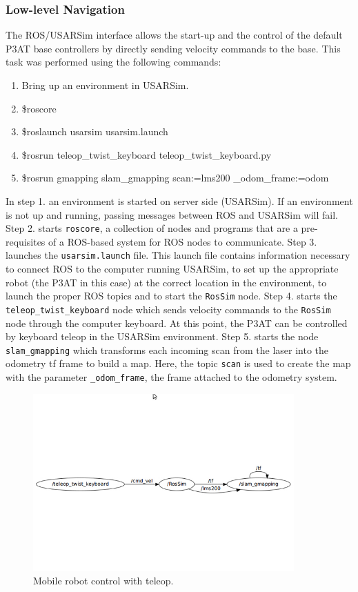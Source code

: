 \subsubsection*{Low-level Navigation}
The ROS/USARSim interface allows the start-up and the control of the default P3AT base controllers by directly sending velocity commands to the base. This task was performed using the following commands:
\begin{enumerate}
\item\footnotesize{Bring up an environment in USARSim.        }
\item\footnotesize{\$roscore}
\item\footnotesize{\$roslaunch usarsim usarsim.launch}
\item\footnotesize{\$rosrun teleop\_twist\_keyboard teleop\_twist\_keyboard.py}
\item\footnotesize{\$rosrun gmapping slam\_gmapping scan:=lms200 \_odom\_frame:=odom}
\end{enumerate}

In step 1. an environment is started on server side (USARSim). If an environment is not up and running, passing messages between ROS and USARSim will fail. Step 2. starts \texttt{roscore}, a collection of nodes and programs that are a pre-requisites of a ROS-based system for ROS nodes to communicate. Step 3. launches the \texttt{usarsim.launch} file. This launch file contains information necessary to connect ROS to the computer running USARSim, to set up the appropriate robot (the P3AT in this case) at the correct location in the environment, to launch the proper ROS topics and to start the \texttt{RosSim} node. Step 4. starts the \texttt{teleop\_twist\_keyboard} node which sends velocity commands to the \texttt{RosSim} node through the computer keyboard. At this point, the P3AT can be controlled by keyboard teleop in the USARSim environment. Step 5. starts the node \texttt{slam\_gmapping} which transforms each incoming scan from the laser into the odometry tf frame to build a map. Here, the topic \texttt{scan} is used to create the map with the parameter \texttt{\_odom\_frame}, the frame attached to the odometry system.

\begin{figure}[t!]
\centering
\includegraphics[width=10cm]{Figures/Misc/low-level.jpg}
\caption{Mobile robot control with teleop.}\label{fig:teleop}
\end{figure}

